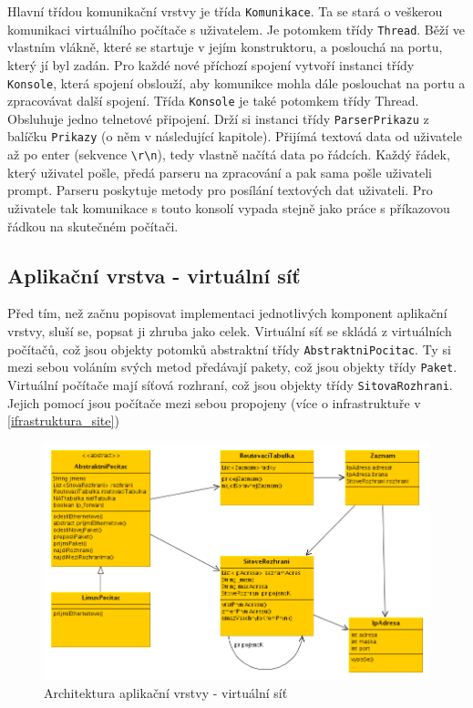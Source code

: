 Hlavní třídou komunikační vrstvy je třída \verb|Komunikace|. Ta se stará o veškerou komunikaci virtuálního počítače s uživatelem. Je potomkem třídy \verb|Thread|. Běží ve vlastním vlákně, které se startuje v jejím konstruktoru, a poslouchá na portu, který jí byl zadán. Pro každé nové příchozí spojení vytvoří instanci třídy \verb|Konsole|, která spojení obslouží, aby komunikce mohla dále poslouchat na portu a zpracovávat další spojení. Třída \verb|Konsole| je také potomkem třídy Thread. Obsluhuje jedno telnetové připojení. Drží si instanci třídy \verb|ParserPrikazu| z balíčku \verb|Prikazy| (o něm v následující kapitole). Přijímá textová data od uživatele až po enter (sekvence \verb|\r\n|), tedy vlastně načítá data po řádcích. Každý řádek, který uživatel pošle, předá parseru na zpracování a pak sama pošle uživateli prompt. Parseru poskytuje metody pro posílání textových dat uživateli. Pro uživatele tak komunikace s touto konsolí vypada stejně jako práce s příkazovou řádkou na skutečném počítači.


\subsection{Aplikační vrstva - virtuální síť}

Před tím, než začnu popisovat implementaci jednotlivých komponent aplikační vrstvy, sluší se, popsat ji zhruba jako celek. Virtuální síť se skládá z virtuálních počítačů, což jsou objekty potomků abstraktní třídy \verb|AbstraktniPocitac|. Ty si mezi sebou voláním svých metod předávají pakety, což jsou objekty třídy \verb|Paket|. Virtuální počítače mají síťová rozhraní, což jsou objekty třídy \verb|SitovaRozhrani|. Jejich pomocí jsou počítače mezi sebou propojeny (více o infrastruktuře v \ref{ifrastruktura_site})

\begin{figure}[h]
\begin{center}
\includegraphics[width=14cm]{obrazky/virtualni_sit}
\caption{Architektura aplikační vrstvy - virtuální síť}
\label{obr_virtualni_sit}
\end{center}
\end{figure}




